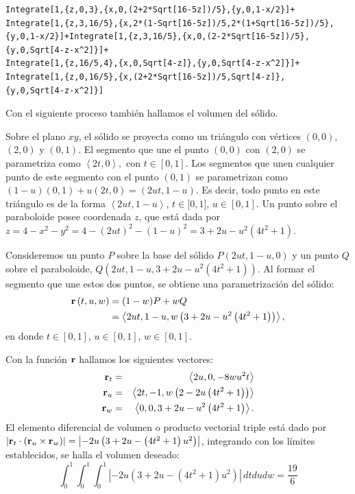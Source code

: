 \begin{tcolorbox}[title=\bf Instrucción en \verb"Mathematica"]\begin{Verbatim}[formatcom=\letraverbatim]
Integrate[1,{z,0,3},{x,0,(2+2*Sqrt[16-5z])/5},{y,0,1-x/2}]+
Integrate[1,{z,3,16/5},{x,2*(1-Sqrt[16-5z])/5,2*(1+Sqrt[16-5z])/5},
{y,0,1-x/2}]+Integrate[1,{z,3,16/5},{x,0,(2-2*Sqrt[16-5z])/5},
{y,0,Sqrt[4-z-x^2]}]+
Integrate[1,{z,16/5,4},{x,0,Sqrt[4-z]},{y,0,Sqrt[4-z-x^2]}]+
Integrate[1,{z,0,16/5},{x,(2+2*Sqrt[16-5z])/5,Sqrt[4-z]},
{y,0,Sqrt[4-z-x^2]}]
\end{Verbatim}
\end{tcolorbox}

Con el siguiente proceso también hallamos el volumen del sólido.

Sobre el plano $xy$, el sólido se proyecta como un triángulo con vértices $(0,0)$, $(2,0)$ y $(0,1)$. El segmento que une el punto $(0,0)$ con $(2,0)$ se parametriza como $\left\langle 2t,0\right\rangle, $ con $t\in [ 0,1]$.
Los segmentos que unen cualquier punto de este segmento con el punto
$(0,1)$ se parametrizan como
$(1-u)(0,1)+u(2t,0)= \left(2ut,1-u\right) $.
Es decir, todo punto en este triángulo es de la forma
$\left\langle 2ut,1-u\right\rangle $, $t\in\lbrack 0,1]$, $u\in [ 0,1]$.
Un punto sobre el paraboloide posee coordenada $z$, que está dada por
$z=4-x^{2}-y^{2}=4-(2ut)^2-(1-u)^2= 3+2u-u^{2}\left(4t^{2}+1\right) $.

Consideremos un punto $P$ sobre la base del sólido {\small $P\left( 2ut,1-u,0\right)$}
y un punto $Q$ sobre el paraboloide, {\small $Q\left( 2ut,1-u,3+2u-u^{2}\left( 4t^{2}+1\right) \right)$}.
Al formar el segmento que une estos dos puntos, se obtiene una parametrización del sólido:
\begin{align*}
{\bf r}\left( t,u,w\right) &= (1-w)P +wQ \\
& = \left\langle 2ut,1-u,w\left( 3+2u-u^{2}\left( 4t^{2}+1\right) \right) \right\rangle,
\end{align*}
en donde $t\in [ 0,1]$, $u\in [ 0,1]$, $w\in [ 0,1]$.

Con la función ${\bf r}$ hallamos los siguientes vectores:
\begin{eqnarray*}
{\bf r}_{t} &=& \left\langle 2u,0,-8wu^{2}t\right\rangle \\
{\bf r}_{u} &=& \left\langle 2t,-1,w\left( 2-2u\left( 4t^{2}+1\right) \right) \right\rangle \\
{\bf r}_{w} &=& \left\langle 0,0,3+2u-u^{2}\left( 4t^{2}+1\right) \right\rangle.
\end{eqnarray*}
El elemento diferencial de volumen o producto vectorial triple está dado por
$|{\bf r}_{t} \cdot ({\bf r}_{u} \times {\bf r}_{w})| =\left| -2u\left( 3+2u-\left(4t^{2}+1\right) u^{2}\right) \right| $,
integrando con los límites establecidos, se halla el volumen deseado:
\[\int_{0}^{1}\int_{0}^{1}\int_{0}^{1}\left| -2u\left( 3+2u-\left(4t^{2}+1\right) u^{2}\right)\right|\, dtdudw = \frac{19}{6} \]

